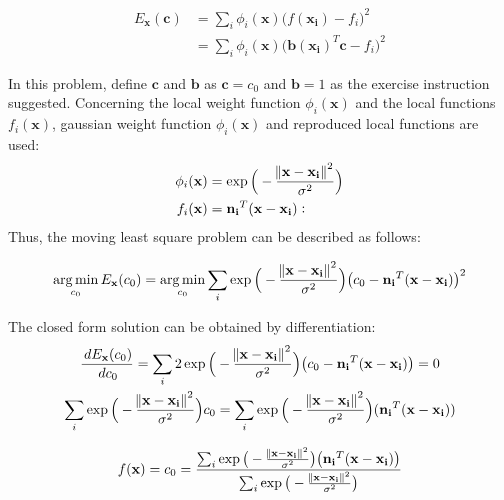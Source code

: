 \documentclass[paper=a4, fontsize=11pt]{scrartcl} %
\numberwithin{equation}{section} %
\numberwithin{figure}{section} %
\numberwithin{table}{section} %
\renewcommand{\vec}[1]{\mathbf{#1}}
\DeclareMathOperator*{\argmin}{arg\,min} %
\begin{document}
\begin{equation}
\begin{split}
	E_\vec{x}(\vec{c}) &= \sum_{i} \phi_i (\vec{x}) \big( f(\vec{x_i}) - f_i \big) ^2 \\ 
	&= \sum_{i} \phi_i (\vec{x}) \big( \vec{b}(\vec{x_i})^T\vec{c} - f_i \big) ^2	
\end{split}
\end{equation}

In this problem, define $\vec{c}$ and $\vec{b}$ as $\vec{c} = c_0$ and $\vec{b} = 1$ as the exercise instruction suggested. Concerning the local weight function $\phi_i(\vec{x})$ and the local functions $f_i(\vec{x})$, gaussian weight function $\phi_i(\vec{x})$ and reproduced local functions are used:
\begin{align}
	\phi_i(\vec{x}) &= \exp \Big( - \frac{\norm{\vec{x} - \vec{x_i}} ^2}{\sigma^2} \Big) \\
	f_i(\vec{x}) &= \vec{n_i}^T (\vec{x} - \vec{x_i}):
\end{align}
Thus, the moving least square problem can be described as follows:

\begin{equation}
	\argmin_{c_0} E_{\vec{x}}(c_0) = \argmin_{c_0} \sum_i \exp \Big( - \frac{\norm{\vec{x} - \vec{x_i}} ^2}{\sigma^2} \Big) \big(c_0 - \vec{n_i}^T(\vec{x} - \vec{x_i}) \big)^2 
\end{equation}

The closed form solution can be obtained by differentiation:
\begin{gather}
	\frac{\,d E_\vec{x}(c_0)}{\,d c_0} = \sum_{i} 2 \exp \Big( - \frac{\norm{\vec{x} - \vec{x_i}} ^2}{\sigma^2} \Big) \big( c_0 - \vec{n_i}^T(\vec{x} - \vec{x_i}) \big) = 0 
	\\
	\sum_{i} \exp \Big( - \frac{\norm{\vec{x} - \vec{x_i}} ^2}{\sigma^2} \Big) c_0 = \sum_{i} \exp \Big( - \frac{\norm{\vec{x} - \vec{x_i}} ^2}{\sigma^2} \Big) (\vec{n_i}^T(\vec{x} - \vec{x_i}))
\end{gather}

\begin{equation}
	f(\vec{x}) = c_0 = \frac{\sum_{i} \exp \big( - \frac{\norm{\vec{x} - \vec{x_i}} ^2}{\sigma^2} \big) \big( \vec{n_i}^T(\vec{x} - \vec{x_i}) \big) }{\sum_{i} \exp \big( - \frac{\norm{\vec{x} - \vec{x_i}} ^2}{\sigma^2} \big)}
\end{equation}


\end{document}
